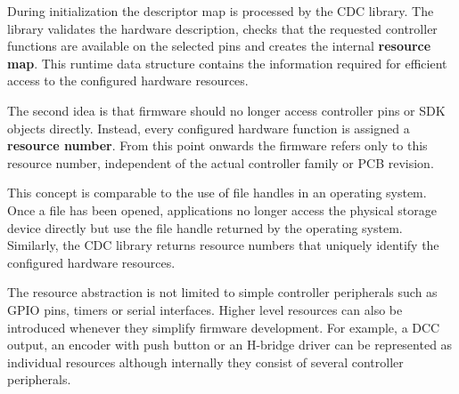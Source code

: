 During initialization the descriptor map is processed by the CDC library. The
library validates the hardware description, checks that the requested controller
functions are available on the selected pins and creates the internal
\textbf{resource map}. This runtime data structure contains the information
required for efficient access to the configured hardware resources.

The second idea is that firmware should no longer access controller pins or SDK
objects directly. Instead, every configured hardware function is assigned a
\textbf{resource number}. From this point onwards the firmware refers only to
this resource number, independent of the actual controller family or PCB
revision.

This concept is comparable to the use of file handles in an operating system.
Once a file has been opened, applications no longer access the physical storage
device directly but use the file handle returned by the operating system.
Similarly, the CDC library returns resource numbers that uniquely identify the
configured hardware resources.

The resource abstraction is not limited to simple controller
peripherals such as GPIO pins, timers or serial interfaces. Higher level
resources can also be introduced whenever they simplify firmware development.
For example, a DCC output, an encoder with push button or an H-bridge driver can
be represented as individual resources although internally they consist of
several controller peripherals.

\begin{center}
\end{center}
\FloatBarrier

